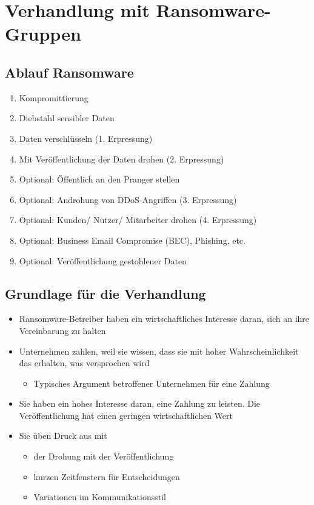 \section{Verhandlung mit Ransomware-Gruppen}

\subsection{Ablauf Ransomware}
\begin{enumerate}
    \item Kompromittierung
    \item Diebstahl sensibler Daten
    \item \textcolor{OSTPink}{Daten verschlüsseln (1. Erpressung)}
    \item \textcolor{OSTPink}{Mit Veröffentlichung der Daten drohen (2. Erpressung)}
    \item Optional: Öffentlich an den Pranger stellen
    \item \textcolor{OSTPink}{Optional: Androhung von DDoS-Angriffen (3. Erpressung)}
    \item \textcolor{OSTPink}{Optional: Kunden/ Nutzer/ Mitarbeiter drohen (4. Erpressung)}
    \item Optional: Business Email Compromise (BEC), Phishing, etc.
    \item Optional: Veröffentlichung gestohlener Daten
\end{enumerate}

\subsection{Grundlage für die Verhandlung}
\begin{itemize}
    \item Ransomware-Betreiber haben ein wirtschaftliches Interesse daran, sich an ihre Vereinbarung zu halten
    \item Unternehmen zahlen, weil sie wissen, dass sie mit hoher Wahrscheinlichkeit das erhalten, was versprochen wird
    \begin{itemize}
        \item Typisches Argument betroffener Unternehmen für eine Zahlung
    \end{itemize}
    \item Sie haben ein hohes Interesse daran, eine Zahlung zu leisten. Die Veröffentlichung hat einen geringen wirtschaftlichen Wert
    \item Sie üben Druck aus mit
    \begin{itemize}
        \item der Drohung mit der Veröffentlichung
        \item kurzen Zeitfenstern für Entscheidungen
        \item Variationen im Kommunikationsstil
    \end{itemize}
\end{itemize}

